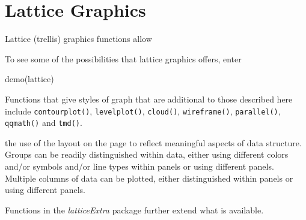 \documentclass{tufte-book}\usepackage[]{graphicx}\usepackage[]{color}
\newcommand{\margtt}[1]{{\footnotesize \texttt{#1}}}
\begin{document}
\section{Lattice Graphics}
\vspace*{9pt}

Lattice (trellis) graphics functions allow
\begin{marginfigure}
To see some of the possibilities that lattice graphics offers, enter
\begin{Schunk}
\begin{Sinput}
demo(lattice)
\end{Sinput}
\end{Schunk}
Functions that give styles of graph that are additional to
those described here include \margtt{contourplot()},
\margtt{levelplot()}, \margtt{cloud()}, \margtt{wireframe()},
\margtt{parallel()}, \margtt{qqmath()} and
\margtt{tmd()}.  
\end{marginfigure}
 the use of the layout on the page to reflect meaningful aspects
 of data structure.  Groups can
be readily distinguished within data, either using different colors
and/or symbols and/or line types within panels or using different
panels.  Multiple columns of data can be plotted, either
distinguished within panels or using different panels.

Functions in the {\em latticeExtra} package
further extend what is available.
\end{document}
